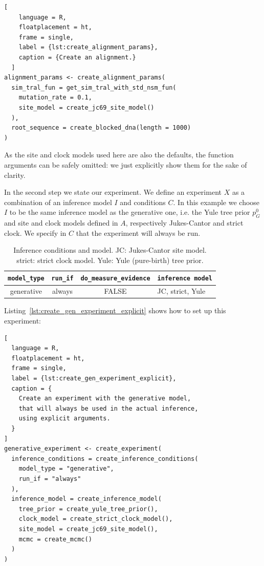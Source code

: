 \begin{lstlisting}[
    language = R,
    floatplacement = ht,
    frame = single,
    label = {lst:create_alignment_params}, 
    caption = {Create an alignment.}
  ]
alignment_params <- create_alignment_params(
  sim_tral_fun = get_sim_tral_with_std_nsm_fun(
    mutation_rate = 0.1,
    site_model = create_jc69_site_model()
  ),
  root_sequence = create_blocked_dna(length = 1000)
)
\end{lstlisting}

As the site and clock models used here are also the defaults, 
the function arguments can be safely omitted: we just explicitly show 
them for the sake of clarity.

In the second step we state our experiment.
We define an experiment $\mathit{X}$ as a combination of an inference model 
$\mathit{I}$ and conditions $\mathit{C}$.
In this example we choose $\mathit{I}$ to be the same inference model as 
the generative one,
i.e. the Yule tree prior $\mathit{p_{G}^0}$ and site 
and clock models defined in $\mathit{A}$, 
respectively Jukes-Cantor and strict clock.
We specify in $\mathit{C}$ that the experiment will always be run.

\begin{table}
  \begin{tabular}{ | c | c | c | l | }
    \hline
    \texttt{model\_type} &
    \texttt{run\_if} &
    \texttt{do\_measure\_evidence} & 
    \texttt{inference model} \\ 
    \hline
    generative &
    always &
    FALSE &
    JC, strict, Yule \\
    \hline
  \end{tabular}
  \caption{
    Inference conditions and model.
    JC: Jukes-Cantor site model.
    strict: strict clock model.
    Yule: Yule (pure-birth) tree prior.
  }
  \label{tab:RQ1}
\end{table}

Listing~\ref{lst:create_gen_experiment_explicit} shows how to
set up this experiment:

\begin{lstlisting}[
  language = R,
  floatplacement = ht,
  frame = single,
  label = {lst:create_gen_experiment_explicit},
  caption = {
    Create an experiment with the generative model,
    that will always be used in the actual inference, 
    using explicit arguments.
  }
]
generative_experiment <- create_experiment(
  inference_conditions = create_inference_conditions(
    model_type = "generative", 
    run_if = "always"
  ), 
  inference_model = create_inference_model(
    tree_prior = create_yule_tree_prior(),
    clock_model = create_strict_clock_model(), 
    site_model = create_jc69_site_model(),
    mcmc = create_mcmc()
  )
)
\end{lstlisting}

